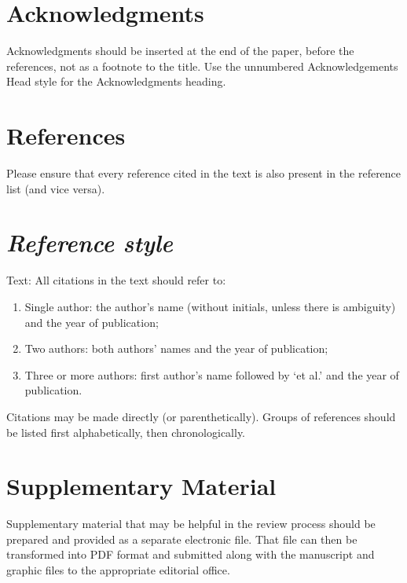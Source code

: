 \documentclass[times,twocolumn,final,authoryear]{elsarticle}
\begin{document}
\section*{Acknowledgments}
Acknowledgments should be inserted at the end of the paper, before the
references, not as a footnote to the title. Use the unnumbered
Acknowledgements Head style for the Acknowledgments heading.

\section*{References}

Please ensure that every reference cited in the text is also present in
the reference list (and vice versa).

\section*{\itshape Reference style}

Text: All citations in the text should refer to:
\begin{enumerate}
\item Single author: the author's name (without initials, unless there
is ambiguity) and the year of publication;
\item Two authors: both authors' names and the year of publication;
\item Three or more authors: first author's name followed by `et al.'
and the year of publication.
\end{enumerate}
Citations may be made directly (or parenthetically). Groups of
references should be listed first alphabetically, then chronologically.




\section*{Supplementary Material}

Supplementary material that may be helpful in the review process should
be prepared and provided as a separate electronic file. That file can
then be transformed into PDF format and submitted along with the
manuscript and graphic files to the appropriate editorial office.
\end{document}

